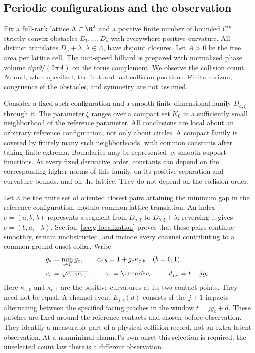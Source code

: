 \subsection{Periodic configurations and the observation}
Fix a full-rank lattice $\Lambda\subset\R^2$ and a positive finite number of bounded
$C^\infty$ strictly convex obstacles $D_1,\ldots,D_s$ with everywhere
positive curvature. All distinct translates $D_a+\lambda$, $\lambda\in
\Lambda$, have disjoint closures. Let $A>0$ be the free area per lattice
cell. The unit-speed billiard is prepared with normalized phase volume
$\dd q\dd\vartheta/(2\pi A)$ on the torus complement. We observe the
collision count $N_t$ and, when specified, the first and last collision
positions. Finite horizon, congruence of the obstacles, and symmetry
are not assumed.

Consider a fixed such configuration and a smooth finite-dimensional
family $D_{a,\xi}$ through it. The parameter $\xi$ ranges over a compact
set $K_0$ in a sufficiently small neighborhood of the reference parameter.
All conclusions are local about an arbitrary reference configuration,
not only about circles. A compact family is covered by finitely many
such neighborhoods, with common constants after taking finite extrema.
Boundaries may be represented by smooth support functions. At every
fixed derivative order, constants can depend on the corresponding
higher norms of this family, on its positive separation and curvature
bounds, and on the lattice. They do not depend on the collision order.

Let $\mathcal E$ be the finite set of oriented closest pairs attaining
the minimum gap in the reference configuration, modulo common lattice
translation. An index $e=(a,b,\lambda)$ represents a segment from
$D_{a,\xi}$ to $D_{b,\xi}+\lambda$; reversing it gives
$\bar e=(b,a,-\lambda)$. Section~\ref{sec:g-localization} proves that
these pairs continue smoothly, remain unobstructed, and include every
channel contributing to a common ground-onset collar. Write
\begin{equation}\label{eq:g-general-data}
 \begin{split}
 g_*&=\min_{e\in\mathcal E}g_e,\qquad
 c_{e,b}=1+g_e\kappa_{e,b}\quad(b=0,1),\\
 c_e&=\sqrt{c_{e,0}c_{e,1}},\qquad \gamma_e=\arcosh c_e,
 \qquad d_{j,e}=t-jg_e.
 \end{split}
\end{equation}
Here $\kappa_{e,0}$ and $\kappa_{e,1}$ are the positive curvatures at
its two contact points. They need not be equal. A channel event
$E_{j,e}(d)$ consists of the $j+1$ impacts alternating between the
specified facing patches in the window $t=jg_e+d$. These patches are
fixed around the reference contacts and chosen before observation.
They identify a measurable part of a physical collision record, not an
extra latent observation. At a nonminimal channel's own onset this
selection is required; the unselected count law there is a different
observation.

